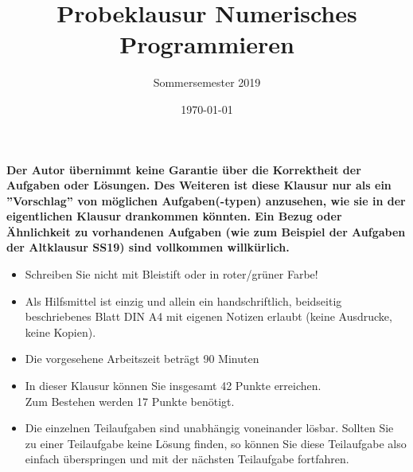 \documentclass{scrartcl}
\begin{document}
\title{Probeklausur Numerisches Programmieren}
\subtitle{Sommersemester 2019}
\author{\npauthor{}}
\date{\today}
\maketitle

\textbf{Der Autor übernimmt keine Garantie über die Korrektheit der Aufgaben oder Lösungen. \n Des Weiteren ist diese Klausur nur als ein ''Vorschlag'' von möglichen Aufgaben(-typen) anzusehen, wie sie in der eigentlichen Klausur drankommen könnten. Ein Bezug oder Ähnlichkeit zu vorhandenen Aufgaben (wie zum Beispiel der Aufgaben der Altklausur SS19) sind vollkommen willkürlich.}
\sbreak

\begin{itemize}
	\item Schreiben Sie nicht mit Bleistift oder in roter/grüner Farbe!
	\item Als Hilfsmittel ist einzig und allein ein handschriftlich, beidseitig beschriebenes Blatt DIN A4 mit eigenen Notizen erlaubt (keine Ausdrucke, keine Kopien).
	\item Die vorgesehene Arbeitszeit beträgt 90 Minuten
	\item In dieser Klausur können Sie insgesamt 42 Punkte erreichen. \\Zum Bestehen werden 17 Punkte benötigt.
	\item Die einzelnen Teilaufgaben sind unabhängig voneinander lösbar.
	Sollten Sie zu einer Teilaufgabe keine Lösung finden, so können Sie diese Teilaufgabe also einfach überspringen und mit der nächsten Teilaufgabe fortfahren.
\end{itemize}
\end{document}
